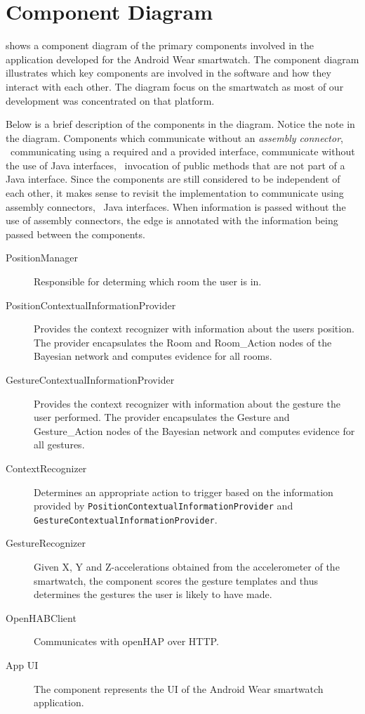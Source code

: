 \section{Component Diagram}
\label{sec:implementation:component-diagram}

 shows a component diagram of the primary components involved in the application developed for the Android Wear smartwatch. The component diagram illustrates which key components are involved in the software and how they interact with each other.
The diagram focus on the smartwatch as most of our development was concentrated on that platform.

Below is a brief description of the components in the diagram. Notice the note in the diagram. Components which communicate without an \emph{assembly connector}, \ie~communicating using a required and a provided interface, communicate without the use of Java interfaces, \eg~invocation of public methods that are not part of a Java interface. Since the components are still considered to be independent of each other, it makes sense to revisit the implementation to communicate using assembly connectors, \ie~Java interfaces. When information is passed without the use of assembly connectors, the edge is annotated with the information being passed between the components.

\begin{description}
\item[PositionManager] Responsible for determing which room the user is in.
\item[PositionContextualInformationProvider] Provides the context recognizer with information about the users position. The provider encapsulates the Room and Room\_Action nodes of the Bayesian network and computes evidence for all rooms.
\item[GestureContextualInformationProvider] Provides the context recognizer with information about the gesture the user performed. The  provider encapsulates the Gesture and Gesture\_Action nodes of the Bayesian network and computes evidence for all gestures.
\item[ContextRecognizer] Determines an appropriate action to trigger based on the information provided by \texttt{PositionContextualInformationProvider} and \texttt{GestureContextualInformationProvider}.
\item[GestureRecognizer] Given X, Y and Z-accelerations obtained from the accelerometer of the smartwatch, the component scores the gesture templates and thus determines the gestures the user is likely to have made.
\item[OpenHABClient] Communicates with openHAP over HTTP.
\item[App UI] The component represents the UI of the Android Wear smartwatch application.
\end{description}

